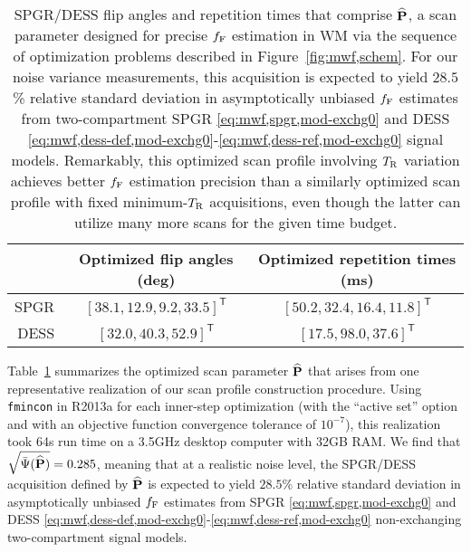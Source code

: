 \begin{table}[!tb]
  \centering
  \begin{tabular}{r | c | c}
    \hline
    \hline
    & Optimized flip angles (deg) & Optimized repetition times (ms) \\
    \hline
    SPGR & $[38.1,12.9,9.2,33.5]^\mathsf{T}$ & $[50.2,32.4,16.4,11.8]^\mathsf{T}$ \\
    DESS & $[32.0,40.3,52.9]^\mathsf{T}$ & $[17.5,98.0,37.6]^\mathsf{T}$ \\
    \hline
    \hline
  \end{tabular}
  \caption{
		SPGR/DESS flip angles and repetition times
		that comprise $\widehat{\mathbf{P}}$,
		a scan parameter designed
		for precise $f_{\mathrm{F}}$ estimation in WM
		via the sequence of optimization problems
		described in Figure~\ref{fig:mwf,schem}. 
		For our noise variance measurements,
		this acquisition is expected
		to yield $28.5$\% relative standard deviation
		in asymptotically unbiased $f_{\mathrm{F}}$ estimates
		from two-compartment
		SPGR \eqref{eq:mwf,spgr,mod-exchg0}
		and DESS \eqref{eq:mwf,dess-def,mod-exchg0}-\eqref{eq:mwf,dess-ref,mod-exchg0}
		signal models.
		Remarkably, 
		this optimized scan profile involving $T_\mathrm{R}$ variation
		achieves better $f_{\mathrm{F}}$ estimation precision
		than a similarly optimized scan profile
		with fixed minimum-$T_\mathrm{R}$ acquisitions,
		even though the latter 
		can utilize many more scans 
		for the given time budget.
  }
  \label{tab:mwf,acq}
\end{table}

Table~\ref{tab:mwf,acq} summarizes
the optimized scan parameter $\widehat{\mathbf{P}}$ 
that arises
from one representative realization 
of our scan profile construction procedure.
Using \texttt{fmincon} 
in \matlab R2013a
for each inner-step optimization
(with the ``active set'' option and
with an objective function convergence tolerance of $10^{-7}$),
this realization took 64s run time
on a 3.5GHz desktop computer with 32GB RAM.
We find that $\sqrt{\bar{\Psi}(\widehat{\mathbf{P}})} = 0.285$, 
meaning that at a realistic noise level,
the SPGR/DESS acquisition defined by $\widehat{\mathbf{P}}$
is expected to yield $28.5$\% relative standard deviation
in asymptotically unbiased $f_{\mathrm{F}}$ estimates
from SPGR \eqref{eq:mwf,spgr,mod-exchg0} 
and DESS 
\eqref{eq:mwf,dess-def,mod-exchg0}-\eqref{eq:mwf,dess-ref,mod-exchg0}
non-exchanging two-compartment signal models.

